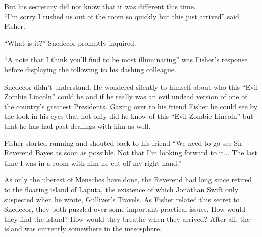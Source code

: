\documentclass{article}
\begin{document}
But his secretary did not know that it was different this time.\\

``I'm sorry I rushed us out of the room so quickly but this just arrived'' said Fisher. 

``What is it?'' Snedecor promptly inquired.

``A note that I think you'll find to be most illuminating'' was Fisher's response before displaying the following to his dashing colleague.


\Fontauri
\Large 
\begin{center}
\end{center}


\normalfont
\normalsize
\vspace{.5in}

Snedecor didn't understand.  He wondered silently to himself about who this ``Evil Zombie Lincoln'' could be and if he really was an evil undead version of one of the country's greatest Presidents.  Gazing over to his friend Fisher he could see by the look in his eyes that not only did he know of this ``Evil Zombie Lincoln'' but that he has had past dealings with him as well.

Fisher started running and shouted back to his friend ``We need to go see Sir Reverend Bayes as soon as possible.  Not that I'm looking forward to it... The last time I was in a room with him he cut off my right hand.''


As only the uberest of Mensches have done, the Reverend had long since retired to the floating island of Laputa, the existence of which Jonathan Swift only suspected when he wrote, \underline{Gulliver's Travels}. As Fisher related this secret to Snedecor, they both puzzled over some important practical issues. How would they find the island? How would they breathe when they arrived? After all, the island was currently somewhere in the mesosphere. \newline
\end{document}
